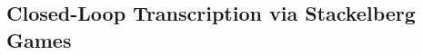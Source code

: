 \documentclass[../../book-main.tex]{subfiles}
\begin{document}

\subsection{Closed-Loop Transcription via Stackelberg Games}\label{sec:closed-loop-transcription}


\end{document}
